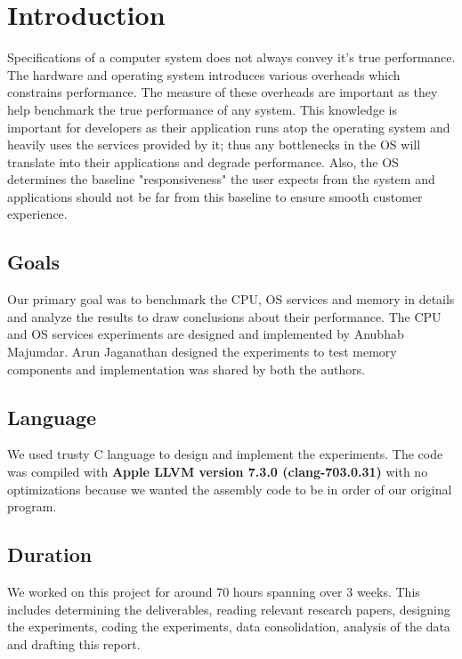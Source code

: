 \documentclass[conference]{IEEEtran}
\begin{document}
\section{Introduction}
Specifications of a computer system does not always convey it's true performance. The hardware and operating system introduces various overheads which constrains performance. The measure of these overheads are important as they help benchmark the true performance of any system. This knowledge is important for developers as their application runs atop the operating system and heavily uses the services provided by it; thus any bottlenecks in the OS will translate into their applications and degrade performance. Also, the OS determines the baseline "responsiveness" the user expects from the system and applications should not be far from this baseline to ensure smooth customer experience. 

\subsection{Goals}
Our primary goal was to benchmark the CPU, OS services and memory in details and analyze the results to draw conclusions about their performance. The CPU and OS services experiments are designed and implemented by Anubhab Majumdar. Arun Jaganathan designed the experiments to test memory components and implementation was shared by both the authors. 

\subsection{Language}
We used trusty C language to design and implement the experiments. The code was compiled with \textbf{Apple LLVM version 7.3.0 (clang-703.0.31)} with no optimizations because we wanted the assembly code to be in order of our original program. 

\subsection{Duration}
We worked on this project for around 70 hours spanning over 3 weeks. This includes determining the deliverables, reading relevant research papers, designing the experiments, coding the experiments, data consolidation, analysis of the data and drafting this report.

\end{document}
